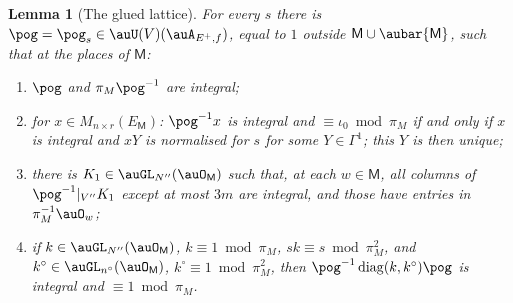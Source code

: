 \documentclass[10pt]{amsart}
\newtheorem{lemma}[theorem]{Lemma}
\theoremstyle{definition}
\theoremstyle{remark}
\begin{document}
\begin{lemma}[The glued lattice]\label{po:lattice}
For every $s$ there is $\pog=\pog_s\in\auU(V)(\auA_{E^+,f})$, equal to $1$ outside
$\mathsf M\cup\aubar{\mathsf M}$, such that at the places of $\mathsf M$:
\begin{enumerate}
\item[(a)] $\pog$ and $\pi_M\pog^{-1}$ are integral;
\item[(b)] for $x\in M_{n\times r}(E_{\mathsf M})$: $\pog^{-1}x$ is integral and $\equiv\iota_0
\bmod\pi_M$ if and only if $x$ is integral and $xY$ is normalised for $s$ for some
$Y\in\Gamma^1$; this $Y$ is then unique;
\item[(c)] there is $K_1\in\auGL_{N''}(\auO_{\mathsf M})$ such that, at each $w\in\mathsf M$, all
columns of $\pog^{-1}|_{V''}K_1$ except at most $3m$ are integral, and those have entries in
$\pi_M^{-1}\auO_w$;
\item[(d)] if $k\in\auGL_{N''}(\auO_{\mathsf M})$, $k\equiv1\bmod\pi_M$, $sk\equiv s\bmod\pi_M^2$,
and $k^\circ\in\auGL_{n^\circ}(\auO_{\mathsf M})$, $k^\circ\equiv1\bmod\pi_M^2$, then
$\pog^{-1}\operatorname{diag}(k,k^\circ)\pog$ is integral and $\equiv1\bmod\pi_M$.
\end{enumerate}
\end{lemma}
\end{document}
